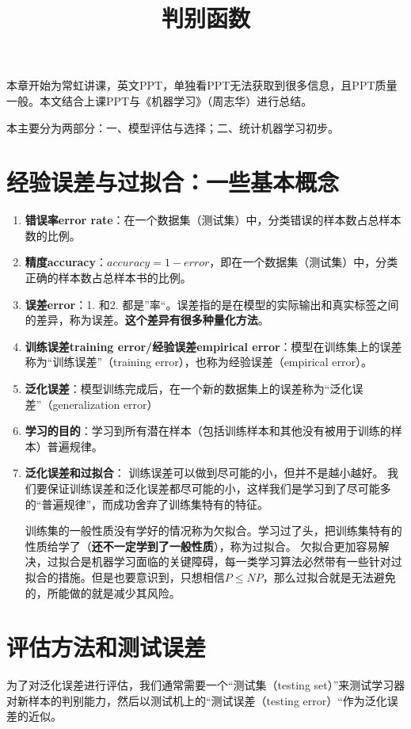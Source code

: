 \documentclass[12pt, letterpaper]{article}
\title{判别函数}
\begin{document}
\maketitle
\tableofcontents
\newpage
本章开始为常虹讲课，英文PPT，单独看PPT无法获取到很多信息，且PPT质量一般。本文结合上课PPT与《机器学习》（周志华）进行总结。

本主要分为两部分：一、模型评估与选择；二、统计机器学习初步。


\section{经验误差与过拟合：一些基本概念}
\begin{enumerate}
\item \textbf{错误率error rate}：在一个数据集（测试集）中，分类错误的样本数占总样本数的比例。
\item \textbf{精度accuracy}：$accuracy=1-error$，即在一个数据集（测试集）中，分类正确的样本数占总样本书的比例。
\item \textbf{误差error}：1. 和2. 都是”率“。误差指的是在模型的实际输出和真实标签之间的差异，称为误差。\textbf{这个差异有很多种量化方法}。
\item \textbf{训练误差training error/经验误差empirical error}：模型在训练集上的误差称为“训练误差”（training error），也称为经验误差（empirical error）。
\item \textbf{泛化误差}：模型训练完成后，在一个新的数据集上的误差称为“泛化误差”（generalization error）
\item 
\textbf{学习的目的}：学习到所有潜在样本（包括训练样本和其他没有被用于训练的样本）普遍规律。
\item \textbf{泛化误差和过拟合}：
训练误差可以做到尽可能的小，但并不是越小越好。
我们要保证训练误差和泛化误差都尽可能的小，这样我们是学习到了尽可能多的“普遍规律”，而成功舍弃了训练集特有的特征。

训练集的一般性质没有学好的情况称为欠拟合。学习过了头，把训练集特有的性质给学了（\textbf{还不一定学到了一般性质}），称为过拟合。
欠拟合更加容易解决，过拟合是机器学习面临的关键障碍，每一类学习算法必然带有一些针对过拟合的措施。但是也要意识到，只想相信$P\leq NP$，那么过拟合就是无法避免的，所能做的就是减少其风险。
\end{enumerate}

\section{评估方法和测试误差}
为了对泛化误差进行评估，我们通常需要一个“测试集（testing set）”来测试学习器对新样本的判别能力，然后以测试机上的“测试误差（testing error）“作为泛化误差的近似。
\end{document}
